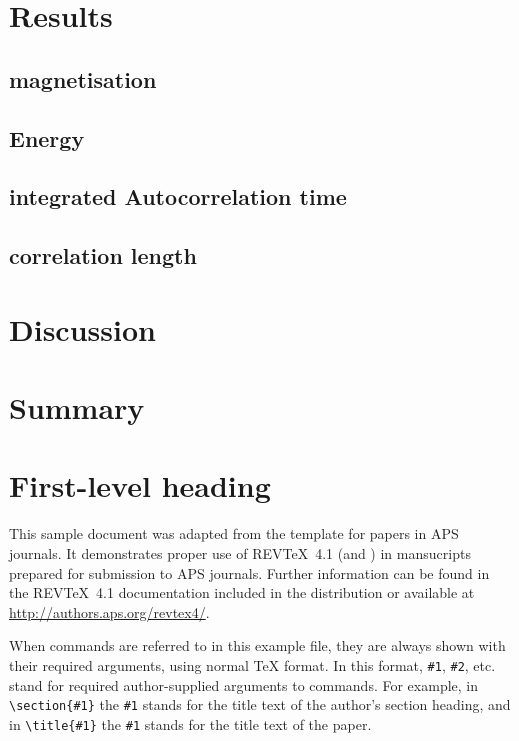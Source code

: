 \documentclass[%
reprint,
 amsmath,amssymb,
 aps,
]{revtex4-2}
\begin{document}
\section{Results}
\subsection{magnetisation}
\subsection{Energy}
\subsection{integrated Autocorrelation time}
\subsection{correlation length}

\section{Discussion}

\section{Summary}


\section{\label{sec:level1}First-level heading}

This sample document was adapted from the template for papers
in APS journals.
It demonstrates proper use of REV\TeX~4.1 (and
\LaTeXe) in mansucripts prepared for submission to APS
journals. Further information can be found in the REV\TeX~4.1
documentation included in the distribution or available at
\url{http://authors.aps.org/revtex4/}.

When commands are referred to in this example file, they are always
shown with their required arguments, using normal \TeX{} format. In
this format, \verb+#1+, \verb+#2+, etc. stand for required
author-supplied arguments to commands. For example, in
\verb+\section{#1}+ the \verb+#1+ stands for the title text of the
author's section heading, and in \verb+\title{#1}+ the \verb+#1+
stands for the title text of the paper.
\end{document}
